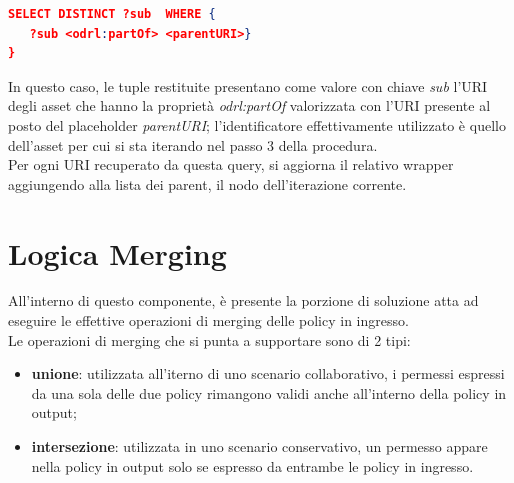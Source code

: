 \documentclass[12pt,a4paper,twoside]{book}
\begin{document}
\begin{lstlisting}[language=json,firstnumber=1,caption={Query SPARQL per il recupero degli asset utili alla procedura di merging},captionpos=b,label=parserRuleCode]
SELECT DISTINCT ?sub  WHERE {
   ?sub <odrl:partOf> <parentURI>}
}
\end{lstlisting}
In questo caso, le tuple restituite presentano come valore con chiave \textit{sub} l'URI degli asset che hanno la proprietà \textit{odrl:partOf} valorizzata con l'URI presente al posto del placeholder \textit{parentURI}; l'identificatore effettivamente utilizzato è quello dell'asset per cui si sta iterando nel passo 3 della procedura.\\
Per ogni URI recuperato da questa query, si aggiorna il relativo wrapper aggiungendo alla lista dei parent, il nodo dell'iterazione corrente.
\section{Logica Merging}
All'interno di questo componente, è presente la porzione di soluzione atta ad eseguire le effettive operazioni di merging delle policy in ingresso.\\
Le operazioni di merging che si punta a supportare sono di 2 tipi:
\begin{itemize}
\item \textbf{unione}: utilizzata all'iterno di uno scenario collaborativo, i permessi espressi da una sola delle due policy rimangono validi anche all'interno della policy in output;
\item \textbf{intersezione}: utilizzata in uno scenario conservativo, un permesso appare nella policy in output solo se espresso da entrambe le policy in ingresso.
\end{itemize}
\end{document}

